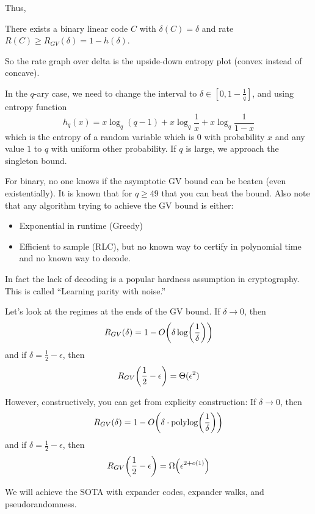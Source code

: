 Thus,
\begin{theorem}
    There exists a binary linear code $C$ with $\delta(C) = \delta$ and rate $R(C) \geq R_{GV}(\delta) = 1 - h(\delta)$.
\end{theorem}
So the rate graph over delta is the upside-down entropy plot (convex instead of concave).

In the $q$-ary case, we need to change the interval to $\delta \in [0, 1 - \frac{1}{q}]$,
and using entropy function
\[ h_q(x) = x \log_q (q - 1) + x \log_q \frac{1}{x} + x \log_q \frac{1}{1 - x} \]
which is the entropy of a random variable which is 0 with probability $x$ and any value $1$ to $q$ with uniform other probability.
If $q$ is large, we approach the singleton bound.

For binary, no one knows if the asymptotic GV bound can be beaten (even existentially). It is known that for $q \geq 49$ that you can beat the bound.
Also note that any algorithm trying to achieve the GV bound is either:
\begin{itemize}
    \item Exponential in runtime (Greedy)
    \item Efficient to sample (RLC), but no known way to certify in polynomial time and no known way to decode.
\end{itemize}
In fact the lack of decoding is a popular hardness assumption in cryptography. This is called ``Learning parity with noise.''

Let's look at the regimes at the ends of the GV bound.
If $\delta \to 0$, then
\[ R_{GV}(\delta) = 1 - O\qty(\delta \log(\frac{1}{\delta})) \]
and if $\delta = \frac{1}{2} - \epsilon$, then \[ R_{GV}\qty(\frac{1}{2} - \epsilon) = \Theta(\epsilon^2) \]

However, constructively, you can get from explicity construction:
If $\delta \to 0$, then
\[ R_{GV}(\delta) = 1 - O\qty(\delta \cdot \text{polylog}\qty(\frac{1}{\delta})) \]
and if $\delta = \frac{1}{2} - \epsilon$, then \[ R_{GV}\qty(\frac{1}{2} - \epsilon) = \Omega\qty(\epsilon^{2 + o(1)}) \]

We will achieve the SOTA with expander codes, expander walks, and pseudorandomness.